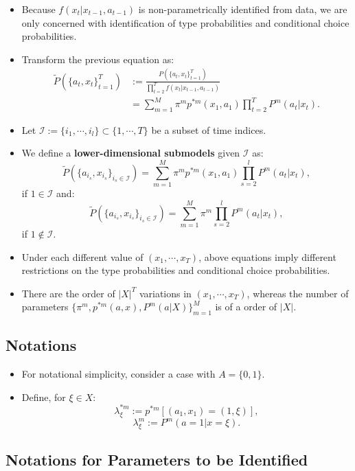 \documentclass[]{book}
\providecommand{\tightlist}{%
  \setlength{\itemsep}{0pt}\setlength{\parskip}{0pt}}
\begin{document}
\begin{itemize}
\tightlist
\item
  Because \(f(x_t|x_{t - 1}, a_{t - 1})\) is non-parametrically
  identified from data, we are only concerned with identification of
  type probabilities and conditional choice probabilities.
\item
  Transform the previous equation as: \[
  \begin{split}
  \widetilde{P}(\{a_t, x_t\}_{t = 1}^T) &:= \frac{P(\{a_t, x_t\}_{t = 1}^T)}{\prod_{t = 2}^T f(x_t|x_{t - 1}, a_{t - 1})}\\
  &= \sum_{m = 1}^M \pi^m p^{*m}(x_1, a_1) \prod_{t = 2}^T P^m(a_t| x_t).
  \end{split}
  \]
\item
  Let \(\mathcal{I} := \{i_1, \cdots, i_l\} \subset \{1, \cdots, T\}\)
  be a subset of time indices.
\item
  We define a \textbf{lower-dimensional submodels} given \(\mathcal{I}\)
  as: \[
  \widetilde{P}(\{a_{i_s}, x_{i_s}\}_{i_s \in \mathcal{I}}) = \sum_{m = 1}^M \pi^m p^{*m}(x_1, a_1) \prod_{s = 2}^l P^m(a_t| x_t),
  \] if \(1 \in \mathcal{I}\) and: \[
  \widetilde{P}(\{a_{i_s}, x_{i_s}\}_{i_s \in \mathcal{I}}) = \sum_{m = 1}^M\pi^m \prod_{s = 2}^l P^m(a_t| x_t),
  \] if \(1 \not\in \mathcal{I}\).
\item
  Under each different value of \((x_1, \cdots, x_T)\), above equations
  imply different restrictions on the type probabilities and conditional
  choice probabilities.
\item
  There are the order of \(|X|^T\) variations in \((x_1, \cdots, x_T)\),
  whereas the number of parameters
  \(\{\pi^m, p^{*m}(a, x), P^m(a|X)\}_{m = 1}^M\) is of a order of
  \(|X|\).
\end{itemize}

\subsection{Notations}\label{notations}

\begin{itemize}
\tightlist
\item
  For notational simplicity, consider a case with \(A = \{0, 1\}\).
\item
  Define, for \(\xi \in X\): \[
  \lambda_\xi^{*m} := p^{*m}[(a_1, x_1) = (1, \xi)],
  \] \[
  \lambda_\xi^m := P^m(a = 1|x = \xi).
  \]
\end{itemize}

\subsection{Notations for Parameters to be
Identified}\label{notations-for-parameters-to-be-identified}
\end{document}
